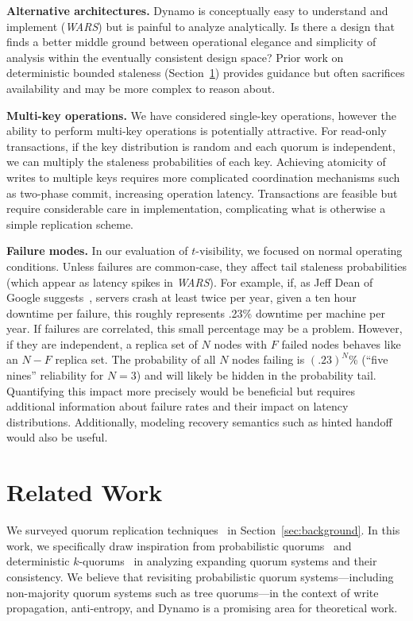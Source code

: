 \documentclass{vldb}
\newcommand{\sectionskip}{-0em}
\begin{document}
\textbf{Alternative architectures.} Dynamo is conceptually easy to
understand and implement (\textit{WARS}) but is painful to analyze
analytically.  Is there a design that finds a better middle ground
between operational elegance and simplicity of analysis within the
eventually consistent design space?  Prior work on deterministic
bounded staleness (Section~\ref{sec:relatedwork}) provides guidance
but often sacrifices availability and may be more complex to reason
about.

\textbf{Multi-key operations.} We have considered single-key
operations, however the ability to perform multi-key operations is
potentially attractive.  For read-only transactions, if the key
distribution is random and each quorum is independent, we can multiply
the staleness probabilities of each key.  Achieving atomicity of
writes to multiple keys requires more complicated coordination
mechanisms such as two-phase commit, increasing operation latency.
Transactions are feasible but require considerable care in
implementation, complicating what is otherwise a simple replication
scheme.

\textbf{Failure modes.} In our evaluation of $t$-visibility, we
focused on normal operating conditions. Unless failures are
common-case, they affect tail staleness probabilities (which appear as
latency spikes in \textit{WARS}).  For example, if, as Jeff Dean of
Google suggests~\cite{dean-keynote}, servers crash at least twice per
year, given a ten hour downtime per failure, this roughly represents
.23\% downtime per machine per year.  If failures are correlated, this
small percentage may be a problem. However, if they are independent, a
replica set of $N$ nodes with $F$ failed nodes behaves like an $N-F$
replica set.  The probability of all $N$ nodes failing is $(.23)^N$\%
(``five nines'' reliability for $N$$=$$3$) and will likely be hidden
in the probability tail.  Quantifying this impact more precisely would
be beneficial but requires additional information about failure rates
and their impact on latency distributions. Additionally, modeling
recovery semantics such as hinted handoff would also be useful.

\vspace{\sectionskip}\section{Related Work}
\label{sec:relatedwork}

We surveyed quorum replication
techniques~\cite{prob-quorum-dynamic, 92-quorums, treequorum, non-strict,
  multi-k-quorum, quorums-start, quorum-placement, partitionedquorum, quorums-alternative, prob-quorum,
  quorum-overview, quorumsystems} in Section~\ref{sec:background}.  In
this work, we specifically draw inspiration from probabilistic
quorums~\cite{prob-quorum} and deterministic
$k$-quorums~\cite{ non-strict, multi-k-quorum} in analyzing
expanding quorum systems and their consistency.  We believe that
revisiting probabilistic quorum systems---including non-majority
quorum systems such as tree quorums---in the context of write
propagation, anti-entropy, and Dynamo is a promising area for theoretical
work.
\end{document}

